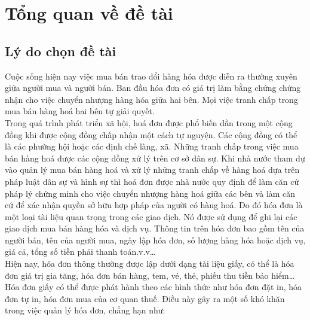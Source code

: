 \chapter{Tổng quan về đề tài} \label{chapter1}

\section{Lý do chọn đề tài}
Cuộc sống hiện nay việc mua bán trao đổi hàng hóa được diễn ra thường xuyên giữa người mua và người bán. Ban đầu hóa đơn có giá trị làm bằng chứng chứng nhận cho việc chuyển nhượng hàng hóa giữa hai bên. Mọi việc tranh chấp trong mua bán hàng hoá hai bên tự giải quyết. \\
\indent Trong quá trình phát triển xã hội, hoá đơn được phổ biến dần trong một cộng đồng khi được cộng đồng chấp nhận một cách tự nguyện. Các cộng đồng có thể là các phường hội hoặc các định chế làng, xã. Những tranh chấp trong việc mua bán hàng hoá được các cộng đồng xử lý trên cơ sở dân sự. Khi nhà nước tham dự vào quản lý mua bán hàng hoá và xử lý những tranh chấp về hàng hoá dựa trên pháp luật dân sự và hình sự thì hoá đơn được nhà nước quy định để làm căn cứ pháp lý chứng minh cho việc chuyển nhượng hàng hoá giữa các bên và làm căn cứ để xác nhận quyền sở hữu hợp pháp của người có hàng hoá. Do đó hóa đơn là một loại tài liệu quan trọng trong các giao dịch. Nó được sử dụng để ghi lại các giao dịch mua bán hàng hóa và dịch vụ. Thông tin trên hóa đơn bao gồm tên của người bán, tên của người mua, ngày lập hóa đơn, số lượng hàng hóa hoặc dịch vụ, giá cả, tổng số tiền phải thanh toán.v.v\dots \\
\indent Hiện nay, hóa đơn thông thường được lập dưới dạng tài liệu giấy, có thể là hóa đơn giá trị gia tăng, hóa đơn bán hàng, tem, vé, thẻ, phiếu thu tiền bảo hiểm\dots Hóa đơn giấy có thể được phát hành theo các hình thức như hóa đơn đặt in, hóa đơn tự in, hóa đơn mua của cơ quan thuế. Điều này gây ra một số khó khăn trong việc quản lý hóa đơn, chẳng hạn như:
